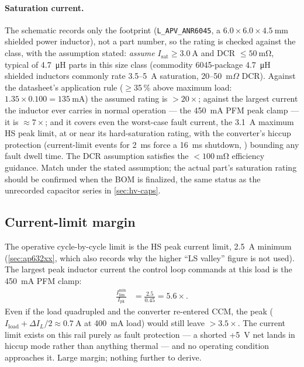 \paragraph{Saturation current.} The schematic records only the footprint
(\texttt{L\_APV\_ANR6045}, a $6.0\times6.0\times\SI{4.5}{\milli\metre}$ shielded power
inductor), not a part number, so the rating is checked against the class, with the
assumption stated: \emph{assume} $I_{\mathrm{sat}} \geq \SI{3.0}{\ampere}$ and DCR
$\leq \SI{50}{\milli\ohm}$, typical of \SI{4.7}{\micro\henry} parts in this size class
(commodity 6045-package \SI{4.7}{\micro\henry} shielded inductors commonly rate
3.5--5~A saturation, 20--50~m$\Omega$ DCR). Against the datasheet's application rule
($\geq$35\,\% above maximum load: $1.35 \times 0.100 = \SI{135}{\milli\ampere}$) the
assumed rating is $>20\times$; against the largest current the inductor ever carries in
normal operation --- the \SI{450}{\milli\ampere} PFM peak clamp --- it is $\approx 7\times$;
and it covers even the worst-case fault current, the \SI{3.1}{\ampere} maximum HS peak
limit, at or near its hard-saturation rating, with the converter's hiccup protection
(current-limit events for 2~ms force a 16~ms shutdown, ) bounding any
fault dwell time. The DCR assumption satisfies the $<\SI{100}{\milli\ohm}$ efficiency
guidance. Match under the stated assumption; the actual part's saturation rating should
be confirmed when the BOM is finalized, the same status as the unrecorded capacitor
series in \cref{sec:hv-caps}.

\subsection{Current-limit margin}\label{sec:5v-ilim}

The operative cycle-by-cycle limit is the HS peak current limit, \SI{2.5}{\ampere}
minimum (\cref{sec:ap632xx}, which also records why the higher ``LS valley'' figure is
not used). The largest peak inductor current the control loop commands at this load is
the \SI{450}{\milli\ampere} PFM clamp:
\begin{align*}
  \frac{I_{\mathrm{lim}}^{\min}}{I_{\mathrm{pk}}} &= \frac{2.5}{0.45} = 5.6\times.
\end{align*}
Even if the load quadrupled and the converter re-entered CCM, the peak
($I_{\mathrm{load}} + \Delta I_L/2 \approx \SI{0.7}{\ampere}$ at \SI{400}{\milli\ampere}
load) would still leave $>3.5\times$. The current limit exists on this rail purely as
fault protection --- a shorted +5~V net lands in hiccup mode rather than anything
thermal --- and no operating condition approaches it. Large margin; nothing further to
derive.

